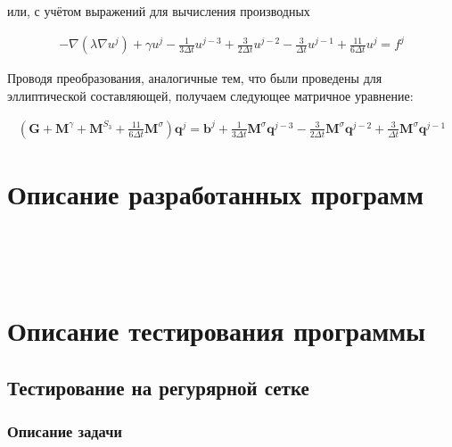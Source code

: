 \documentclass[12pt]{article}
\begin{document}
\vspace{5mm}
\noindent или, с учётом выражений для вычисления производных

\begin{align}
  -\nabla(\lambda \nabla u^j) + \gamma u^j - 
    \frac{1}{3 \Delta t} u^{j-3} +
    \frac{3}{2 \Delta t} u^{j-2} -
    \frac{3}{\Delta t} u^{j-1} + 
    \frac{11}{6 \Delta t} u^j = f^j
\end{align}

\vspace{5mm}
\noindent Проводя преобразования, аналогичные тем, что были проведены для эллиптической составляющей, 
  получаем следующее матричное уравнение:

\begin{align}
  (\textbf{G} + \textbf{M}^{\gamma} + \textbf{M}^{S_3} + 
    \frac{11}{6 \Delta t}\textbf{M}^{\sigma})\textbf{q}^j = \textbf{b}^j 
      + \frac{1}{3 \Delta t} \textbf{M}^{\sigma}\textbf{q}^{j-3}
      - \frac{3}{2 \Delta t} \textbf{M}^{\sigma}\textbf{q}^{j-2}
      + \frac{3}{\Delta t} \textbf{M}^{\sigma}\textbf{q}^{j-1}
\end{align}

\vspace{3mm}

\section{Описание разработанных программ}

\inputminted[firstline=7, lastline=53]{c}{pde/include/numx/pde/msh.h}
\inputminted[firstline=11, lastline=80]{c}{pde/include/numx/pde/cnd.h}
\inputminted[firstline=8, lastline=139]{c}{pde/include/numx/pde/sim.h}
\inputminted[firstline=34, lastline=164]{c}{pde/include/numx/pde/slv.h}
\inputminted[firstline=6, lastline=29]{c}{pde/include/numx/pde/fem.h}

\newpage

\section{Описание тестирования программы}

\subsection{Тестирование на регурярной сетке}
\subsubsection{Описание задачи}
\end{document}
